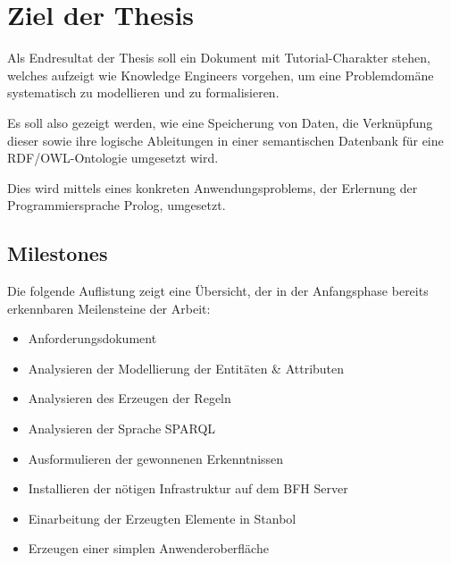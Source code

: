 \chapter{Ziel der Thesis}
\label{chap:thesisziel}
Als Endresultat der Thesis soll ein Dokument mit Tutorial-Charakter stehen, welches aufzeigt wie Knowledge Engineers vorgehen, um eine Problemdomäne systematisch zu modellieren und zu formalisieren.

Es soll also gezeigt werden, wie eine Speicherung von Daten, die Verknüpfung dieser sowie ihre logische Ableitungen in einer semantischen Datenbank für eine RDF/OWL-Ontologie umgesetzt wird.~\cite{Aufgabenstellung}

Dies wird mittels eines konkreten Anwendungsproblems, der Erlernung der Programmiersprache Prolog, umgesetzt.

\section{Milestones}
\label{sec:Milestones}
Die folgende Auflistung zeigt eine Übersicht, der in der Anfangsphase bereits erkennbaren Meilensteine der Arbeit:
\begin{itemize}
	\item Anforderungsdokument \\
	\item Analysieren der Modellierung der Entitäten \& Attributen \\
	\item Analysieren des Erzeugen der Regeln \\
	\item Analysieren der Sprache SPARQL \\
	\item Ausformulieren der gewonnenen Erkenntnissen \\
	\item Installieren der nötigen Infrastruktur auf dem BFH Server\\
	\item Einarbeitung der Erzeugten Elemente in Stanbol \\
	\item Erzeugen einer simplen Anwenderoberfläche \\
\end{itemize}

